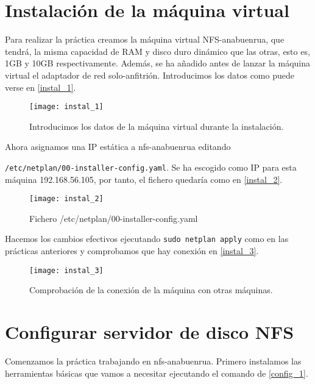 
\chapter{Instalación de la máquina virtual}

Para realizar la práctica creamos la máquina virtual NFS-anabuenrua, que tendrá, la misma capacidad de RAM y disco duro dinámico que las otras, esto es, 1GB y 10GB respectivamente. Además, se ha añadido antes de lanzar la máquina virtual el adaptador de red solo-anfitrión. Introducimos los datos como puede verse en \eqref{instal_1}.

\begin{figure}[h!]
\begin{center}
\caption{Introducimos los datos de la máquina virtual durante la instalación.}
\label{instal_1}
\texttt{[image: instal\_1]}
\end{center}
\end{figure}

Ahora asignamos una IP estática a nfs-anabuenrua editando 

\verb|/etc/netplan/00-installer-config.yaml|. Se ha escogido como IP para esta máquina 192.168.56.105, por tanto, el fichero quedaría como en \eqref{instal_2}.

\begin{figure}[h!]
\begin{center}
\caption{Fichero /etc/netplan/00-installer-config.yaml}
\label{instal_2}
\texttt{[image: instal\_2]}
\end{center}
\end{figure}

Hacemos los cambios efectivos ejecutando \verb|sudo netplan apply| como en las prácticas anteriores y comprobamos que hay conexión en \eqref{instal_3}.

\begin{figure}[h!]
\begin{center}
\caption{Comprobación de la conexión de la máquina con otras máquinas.}
\label{instal_3}
\texttt{[image: instal\_3]}
\end{center}
\end{figure}

\chapter{Configurar servidor de disco NFS}

Comenzamos la práctica trabajando en nfs-anabuenrua. Primero instalamos las herramientas básicas que vamos a necesitar ejecutando el comando de \eqref{config_1}.

